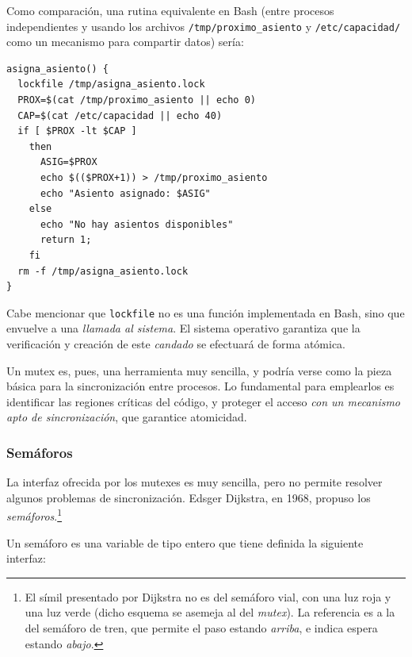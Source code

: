 \documentclass[11pt,fleqn]{book} %
\begin{document}
Como comparación, una rutina equivalente en Bash (entre procesos
independientes y usando los archivos \texttt{/tmp/proximo\_asiento} y
\texttt{/etc/capacidad/} como un mecanismo para compartir datos) sería:


\begin{verbatim}
asigna_asiento() {
  lockfile /tmp/asigna_asiento.lock
  PROX=$(cat /tmp/proximo_asiento || echo 0)
  CAP=$(cat /etc/capacidad || echo 40)
  if [ $PROX -lt $CAP ]
    then
      ASIG=$PROX
      echo $(($PROX+1)) > /tmp/proximo_asiento
      echo "Asiento asignado: $ASIG"
    else
      echo "No hay asientos disponibles"
      return 1;
    fi
  rm -f /tmp/asigna_asiento.lock
}
\end{verbatim}

Cabe mencionar que \texttt{lockfile} no es una función implementada en Bash,
sino que envuelve a una \emph{llamada al sistema}. El sistema operativo
garantiza que la verificación y creación de este \emph{candado} se
efectuará de forma atómica.

Un mutex es, pues, una herramienta muy sencilla, y podría verse como
la pieza básica para la sincronización entre procesos. Lo fundamental
para emplearlos es identificar las regiones críticas del código, y
proteger el acceso \emph{con un mecanismo apto de sincronización}, que
garantice atomicidad.
\subsubsection{Semáforos}
\label{sec-3-3-3-2}


La interfaz ofrecida por los mutexes es muy sencilla, pero no permite
resolver algunos problemas de sincronización. Edsger Dijkstra, en
1968, propuso los \emph{semáforos}.\footnote{El símil presentado por Dijkstra
no es del semáforo vial, con una luz roja y una luz verde (dicho
esquema se asemeja al del \emph{mutex}). La referencia es a la del semáforo
de tren, que permite el paso estando \emph{arriba}, e indica espera estando
\emph{abajo}. } 

Un semáforo es una variable de tipo entero que tiene definida la
siguiente interfaz:
\end{document}
